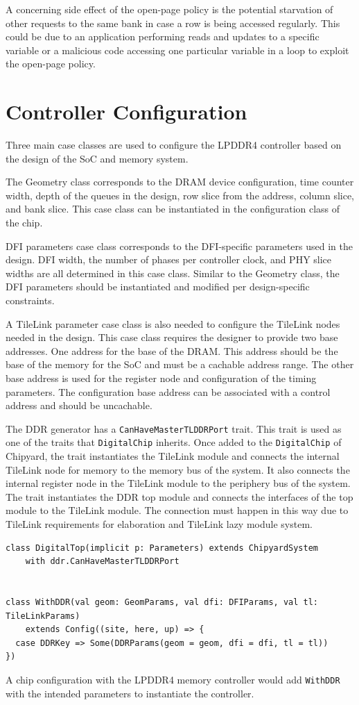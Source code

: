 A concerning side effect of the open-page policy is the potential starvation of other requests to the same bank in case a row is being accessed regularly. This could be due to an application performing reads and updates to a specific variable or a malicious code accessing one particular variable in a loop to exploit the open-page policy.



\section{Controller Configuration}
Three main case classes are used to configure the LPDDR4 controller based on the design of the SoC and memory system. 

The Geometry class corresponds to the DRAM device configuration, time counter width, depth of the queues in the design, row slice from the address, column slice, and bank slice. This case class can be instantiated in the configuration class of the chip. 

DFI parameters case class corresponds to the DFI-specific parameters used in the design. DFI width, the number of phases per controller clock, and PHY slice widths are all determined in this case class. Similar to the Geometry class, the DFI parameters should be instantiated and modified per design-specific constraints. 

A TileLink parameter case class is also needed to configure the TileLink nodes needed in the design. This case class requires the designer to provide two base addresses. One address for the base of the DRAM. This address should be the base of the memory for the SoC and must be a cachable address range. The other base address is used for the register node and configuration of the timing parameters. The configuration base address can be associated with a control address and should be uncachable. 

The DDR generator has a \verb|CanHaveMasterTLDDRPort| trait. This trait is used as one of the traits that \verb|DigitalChip| inherits. Once added to the \verb|DigitalChip| of Chipyard, the trait instantiates the TileLink module and connects the internal TileLink node for memory to the memory bus of the system. It also connects the internal register node in the TileLink module to the periphery bus of the system. The trait instantiates the DDR top module and connects the interfaces of the top module to the TileLink module. The connection must happen in this way due to TileLink requirements for elaboration and TileLink lazy module system.
\begin{verbatim}
class DigitalTop(implicit p: Parameters) extends ChipyardSystem
    with ddr.CanHaveMasterTLDDRPort

        
class WithDDR(val geom: GeomParams, val dfi: DFIParams, val tl:  TileLinkParams) 
    extends Config((site, here, up) => {
  case DDRKey => Some(DDRParams(geom = geom, dfi = dfi, tl = tl))
})  
\end{verbatim}

A chip configuration with the LPDDR4 memory controller would add \verb|WithDDR| with the intended parameters to instantiate the controller. 

